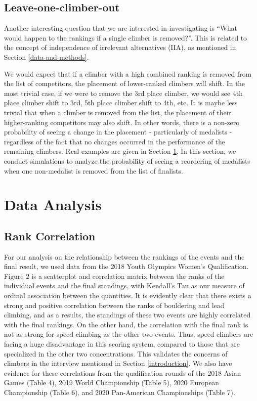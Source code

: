 \documentclass[12pt]{article}
\begin{document}
\hypertarget{leave-one-climber-out}{%
\subsection{Leave-one-climber-out}\label{leave-one-climber-out}}

Another interesting question that we are interested in investigating is
``What would happen to the rankings if a single climber is removed?''.
This is related to the concept of independence of irrelevant
alternatives (IIA), as mentioned in Section \ref{data-and-methods}.

We would expect that if a climber with a high combined ranking is
removed from the list of competitors, the placement of lower-ranked
climbers will shift. In the most trivial case, if we were to remove the
3rd place climber, we would see 4th place climber shift to 3rd, 5th
place climber shift to 4th, etc. It is maybe less trivial that when a
climber is removed from the list, the placement of their higher-ranking
competitors may also shift. In other words, there is a non-zero
probability of seeing a change in the placement - particularly of
medalists - regardless of the fact that no changes occurred in the
performance of the remaining climbers. Real examples are given in
Section \ref{data-analysis}. In this section, we conduct simulations to
analyze the probability of seeing a reordering of medalists when one
non-medalist is removed from the list of finalists.

\hypertarget{data-analysis}{%
\section{Data Analysis}\label{data-analysis}}

\hypertarget{rank-correlation}{%
\subsection{Rank Correlation}\label{rank-correlation}}

For our analysis on the relationship between the rankings of the events
and the final result, we used data from the 2018 Youth Olympics Women's
Qualification. Figure 2 is a scatterplot and correlation matrix between
the ranks of the individual events and the final standings, with
Kendall's Tau \citep{kendall1938} as our measure of ordinal association
between the quantities. It is evidently clear that there exists a strong
and positive correlation between the ranks of bouldering and lead
climbing, and as a results, the standings of these two events are highly
correlated with the final rankings. On the other hand, the correlation
with the final rank is not as strong for speed climbing as the other two
events. Thus, speed climbers are facing a huge disadvantage in this
scoring system, compared to those that are specialized in the other two
concentrations. This validates the concerns of climbers in the interview
mentioned in Section \ref{introduction}. We also have evidence for these
correlations from the qualification rounds of the 2018 Asian Games
(Table 4), 2019 World Championship (Table 5), 2020 European Championship
(Table 6), and 2020 Pan-American Championships (Table 7).
\end{document}
